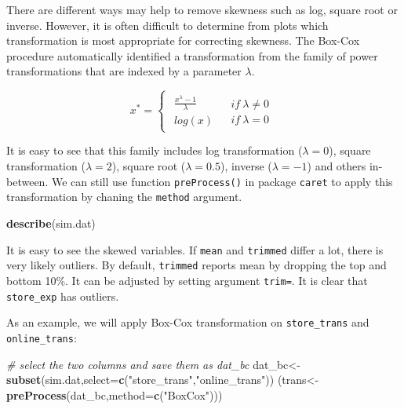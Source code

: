\documentclass[12pt,]{krantz}
\makeatletter
\newenvironment{Shaded}{\begin{snugshade}}{\end{snugshade}}
\newcommand{\KeywordTok}[1]{\textcolor[rgb]{0.27,0.27,0.27}{\textbf{#1}}}
\newcommand{\DataTypeTok}[1]{\textcolor[rgb]{0.27,0.27,0.27}{#1}}
\newcommand{\StringTok}[1]{\textcolor[rgb]{0.5,0.5,0.5}{#1}}
\newcommand{\CommentTok}[1]{\textcolor[rgb]{0.37,0.37,0.37}{\textit{#1}}}
\newcommand{\NormalTok}[1]{#1}
\newenvironment{kframe}{%
\medskip{}
\setlength{\fboxsep}{.8em}
 \def\at@end@of@kframe{}%
 \ifinner\ifhmode%
  \def\at@end@of@kframe{\end{minipage}}%
  \begin{minipage}{\columnwidth}%
 \fi\fi%
 \def\FrameCommand##1{\hskip\@totalleftmargin \hskip-\fboxsep
 \colorbox{shadecolor}{##1}\hskip-\fboxsep
     \hskip-\linewidth \hskip-\@totalleftmargin \hskip\columnwidth}%
 \MakeFramed {\advance\hsize-\width
   \@totalleftmargin\z@ \linewidth\hsize
   \@setminipage}}%
 {\par\unskip\endMakeFramed%
 \at@end@of@kframe}
\renewenvironment{Shaded}{\begin{kframe}}{\end{kframe}}
\theoremstyle{definition}
\theoremstyle{definition}
\theoremstyle{definition}
\theoremstyle{remark}
\makeatother
\begin{document}
There are different ways may help to remove skewness such as log, square
root or inverse. However, it is often difficult to determine from plots
which transformation is most appropriate for correcting skewness. The
Box-Cox procedure automatically identified a transformation from the
family of power transformations that are indexed by a parameter
\(\lambda\)\citep{BOXCOX1}.

\[
x^{*}=\begin{cases}
\begin{array}{c}
\frac{x^{\lambda}-1}{\lambda}\\
log(x)
\end{array} & \begin{array}{c}
if\ \lambda\neq0\\
if\ \lambda=0
\end{array}\end{cases}
\]

It is easy to see that this family includes log transformation
(\(\lambda=0\)), square transformation (\(\lambda=2\)), square root
(\(\lambda=0.5\)), inverse (\(\lambda=-1\)) and others in-between. We
can still use function \texttt{preProcess()} in package \texttt{caret}
to apply this transformation by chaning the \texttt{method} argument.

\begin{Shaded}
\begin{Highlighting}[]
\KeywordTok{describe}\NormalTok{(sim.dat)}
\end{Highlighting}
\end{Shaded}

It is easy to see the skewed variables. If \texttt{mean} and
\texttt{trimmed} differ a lot, there is very likely outliers. By
default, \texttt{trimmed} reports mean by dropping the top and bottom
10\%. It can be adjusted by setting argument \texttt{trim=}. It is clear
that \texttt{store\_exp} has outliers.

As an example, we will apply Box-Cox transformation on
\texttt{store\_trans} and \texttt{online\_trans}:

\begin{Shaded}
\begin{Highlighting}[]
\CommentTok{# select the two columns and save them as dat_bc}
\NormalTok{dat_bc<-}\KeywordTok{subset}\NormalTok{(sim.dat,}\DataTypeTok{select=}\KeywordTok{c}\NormalTok{(}\StringTok{"store_trans"}\NormalTok{,}\StringTok{"online_trans"}\NormalTok{))}
\NormalTok{(trans<-}\KeywordTok{preProcess}\NormalTok{(dat_bc,}\DataTypeTok{method=}\KeywordTok{c}\NormalTok{(}\StringTok{"BoxCox"}\NormalTok{)))}
\end{Highlighting}
\end{Shaded}
\end{document}
